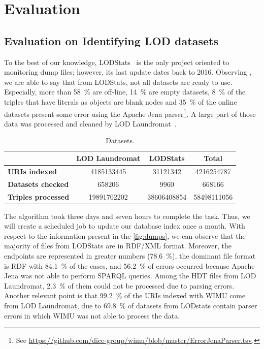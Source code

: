 \documentclass[sw]{iosart2x}
\begin{document}
\section{Evaluation}
\label{sec:eval}

\subsection{Evaluation on Identifying LOD datasets}

To the best of our knowledge, LODStats~\cite{auer2012lodstats} is the only project oriented to monitoring dump files; however, its last update dates back to 2016. 
Observing , we are able to say that from LODStats, not all datasets are ready to use.
Especially, more than \SI{58}{\percent} are off-line, \SI{14}{\percent} are empty datasets, \SI{8}{\percent} of the triples that have literals as objects are blank nodes and \SI{35}{\percent} of the online datasets present some error using the Apache Jena parser\footnote{See \url{https://github.com/dice-group/wimu/blob/master/ErrorJenaParser.tsv}.}. 
A large part of those data was processed and cleaned by LOD Laundromat~\cite{beek2014lod}.


\setlength{\tabcolsep}{0.1em} %
\begin{table}[H]
	\centering
	\caption{Datasets.}
	\label{tab:lodstats}
    \scriptsize
    \begin{tabular}{lS[table-format=11.0]S[table-format=12.0]S[table-format=12.0]} %
    \toprule
    & \textbf{LOD Laundromat} & \textbf{LODStats} & \textbf{Total} \\
    \midrule
    \textbf{URIs indexed} & 4185133445 & 31121342 & 4216254787 \\
    \textbf{Datasets checked} & 658206 & 9960 & 668166 \\
    \textbf{Triples processed} & 19891702202 & 38606408854 & 58498111056 \\
    \bottomrule
    \end{tabular}
\end{table}

The algorithm took three days and seven hours to complete the task. 
Thus, we will create a scheduled job to update our database index once a month.
With respect to the information present in the \cref{fig:dumps}, we can observe that the majority of files from LODStats are in RDF/XML format.
Moreover, the endpoints are represented in greater numbers (\SI{78.6}{\percent}), the dominant file format is RDF with \SI{84.1}{\percent} of the cases, and \SI{56.2}{\percent} of errors occurred because Apache Jena was not able to perform SPARQL queries.
Among the HDT files from LOD Laundromat, \SI{2.3}{\percent} of them could not be processed due to parsing errors.
Another relevant point is that \SI{99.2}{\percent} of the URIs indexed with WIMU come from LOD Laundromat, due to \SI{69.8}{\percent} of datasets from LODstats contain parser errors in which WIMU was not able to process the data.
\end{document}
